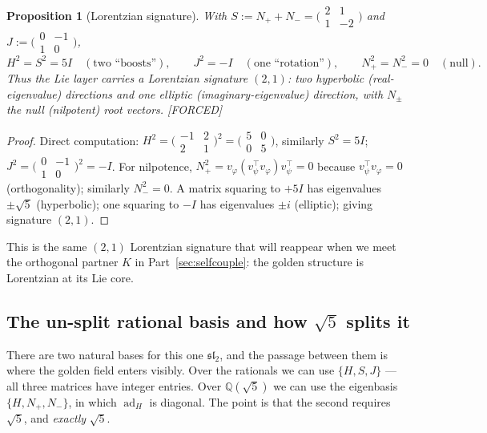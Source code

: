 \documentclass[11pt]{article}
\theoremstyle{plain}
\newtheorem{proposition}[theorem]{Proposition}
\theoremstyle{definition}
\theoremstyle{remark}
\newcommand{\Forced}{\textcolor{forcedc}{[FORCED]}}
\newcommand{\ad}{\operatorname{ad}}
\begin{document}
\begin{proposition}[Lorentzian signature]\label{prop:sig}
With $S:=N_{+}+N_{-}=\bigl(\begin{smallmatrix}2&1\\1&-2\end{smallmatrix}\bigr)$ and $J:=\bigl(\begin{smallmatrix}0&-1\\1&0\end{smallmatrix}\bigr)$,
\[
H^{2}=S^{2}=5I\quad(\text{two ``boosts''}),\qquad J^{2}=-I\quad(\text{one ``rotation''}),\qquad N_{+}^{2}=N_{-}^{2}=0\quad(\text{null}).
\]
Thus the Lie layer carries a Lorentzian signature $(2,1)$: two hyperbolic (real-eigenvalue) directions and one elliptic (imaginary-eigenvalue) direction, with $N_\pm$ the null (nilpotent) root vectors. \Forced
\end{proposition}
\begin{proof}
Direct computation: $H^{2}=\bigl(\begin{smallmatrix}-1&2\\2&1\end{smallmatrix}\bigr)^{2}=\bigl(\begin{smallmatrix}5&0\\0&5\end{smallmatrix}\bigr)$, similarly $S^{2}=5I$; $J^{2}=\bigl(\begin{smallmatrix}0&-1\\1&0\end{smallmatrix}\bigr)^{2}=-I$. For nilpotence, $N_{+}^{2}=v_φ(v_ψ^{\!\top}v_φ)v_ψ^{\!\top}=0$ because $v_ψ^{\!\top}v_φ=0$ (orthogonality); similarly $N_{-}^{2}=0$. A matrix squaring to $+5I$ has eigenvalues $\pm\sqrt5$ (hyperbolic); one squaring to $-I$ has eigenvalues $\pm i$ (elliptic); giving signature $(2,1)$.
\end{proof}

This is the same $(2,1)$ Lorentzian signature that will reappear when we meet the orthogonal partner $K$ in Part~\ref{sec:selfcouple}: the golden structure is Lorentzian at its Lie core.

\subsection{The un-split rational basis and how $\sqrt5$ splits it}
There are two natural bases for this one $𝔰𝔩_2$, and the passage between them is where the golden field enters visibly. Over the rationals we can use $\{H,S,J\}$ --- all three matrices have integer entries. Over $ℚ(\sqrt5)$ we can use the eigenbasis $\{H,N_+,N_-\}$, in which $\ad_H$ is diagonal. The point is that the second requires $\sqrt5$, and \emph{exactly} $\sqrt5$.
\end{document}
